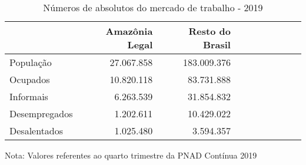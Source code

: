 \begin{table}[H]
\centering
\label{\_retrato\_emprego\_caracterizacao\_table}
\begin{threeparttable}
\caption{Números de absolutos do mercado de trabalho - 2019}
\begin{tabular}{l*{3}{rrr}}
\midrule \midrule
                    &Amazônia Legal&Resto do Brasil\\
\midrule
População         &  27.067.858& 183.009.376\\
Ocupados            &  10.820.118&  83.731.888\\
Informais           &   6.263.539&  31.854.832\\
Desempregados       &   1.202.611&  10.429.022\\
Desalentados        &   1.025.480&   3.594.357\\
\bottomrule
\end{tabular}
\begin{tablenotes}
\scriptsize{Nota: Valores referentes ao quarto trimestre da PNAD Contínua 2019}
\end{tablenotes}
\end{threeparttable}
\end{table}
